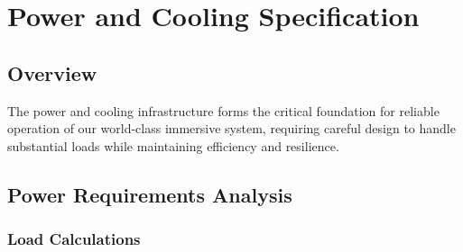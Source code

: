 \chapter{Power and Cooling Specification}

\section{Overview}

The power and cooling infrastructure forms the critical foundation for reliable operation of our world-class immersive system, requiring careful design to handle substantial loads while maintaining efficiency and resilience.

\section{Power Requirements Analysis}

\subsection{Load Calculations}

%

